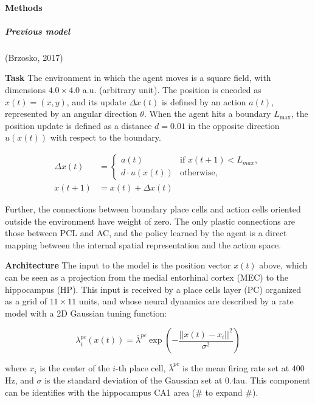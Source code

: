 
\paragraph{Methods}
\hfill

\subparagraph{Previous model} (Brzosko, 2017)

\noindent\textbf{Task}
\hfill \break
\noindent The environment in which the agent moves is a square field, with dimensions $4.0\times 4.0$ a.u. (arbitrary unit).
The position is encoded as $x(t)=(x, y)$, and its update $\Delta x(t)$ is defined by an action $a(t)$, represented by an angular direction $\theta$. When the agent hits a boundary $L_{\max}$, the position update is defined as a distance $d=0.01$ in the opposite direction $u(x(t))$ with respect to the boundary.

\begin{equation}
\begin{aligned}
\Delta x(t)&=
\begin{cases}   
a(t) & \text{if } x(t+1)<L_{max},\\
d\cdot u(x(t)) & \text{otherwise},
\end{cases} \\
x(t+1)&= x(t) + \Delta x(t)
\end{aligned}
\end{equation} 

\noindent Further, the connections between boundary place cells and action cells oriented outside the environment have weight of zero.
The only plastic connections are those between PCL and
AC, and the policy learned by the agent is a direct mapping between the internal spatial representation and the action space. 
\vspace{0.25cm}

\noindent\textbf{Architecture}
\hfill \break
\noindent The input to the model is the position vector $x(t)$ above, which can be seen as a projection from the medial entorhinal cortex (MEC) to the hippocampus (HP). This input is received by a place cells layer (PC) organized as a grid of $11\times 11$ units, and whose neural dynamics are
described by a rate model with a 2D Gaussian tuning function:

\begin{equation}
    \lambda^{pc}_{i}(x(t)) = \bar{\lambda}^{pc}\exp\left(-\frac{||x(t)-x_{i}||^{2}}{\sigma^2}\right)
\end{equation}

\noindent
where $x_{i}$ is the center of the $i$-th place cell, $\bar{\lambda}^{pc}$ is the mean firing rate set at $400$Hz, and $\sigma$ is the standard deviation of the Gaussian set at $0.4$au. This component can be identifies with the hippocampus CA1 area (\# to expand \#).
\vspace{0.25cm}

